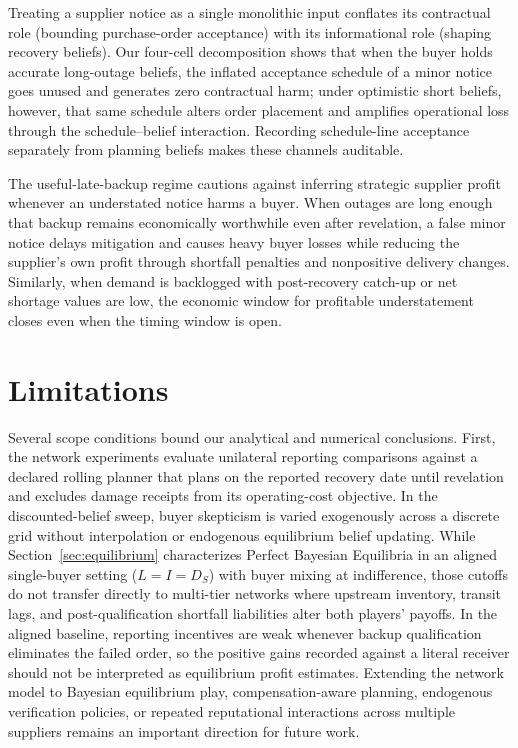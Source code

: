 \documentclass[preprint,11pt,authoryear]{elsarticle}
\begin{document}
Treating a supplier notice as a single monolithic input conflates its contractual role (bounding purchase-order acceptance) with its informational role (shaping recovery beliefs). Our four-cell decomposition shows that when the buyer holds accurate long-outage beliefs, the inflated acceptance schedule of a minor notice goes unused and generates zero contractual harm; under optimistic short beliefs, however, that same schedule alters order placement and amplifies operational loss through the schedule--belief interaction. Recording schedule-line acceptance separately from planning beliefs makes these channels auditable.

The useful-late-backup regime cautions against inferring strategic supplier profit whenever an understated notice harms a buyer. When outages are long enough that backup remains economically worthwhile even after revelation, a false minor notice delays mitigation and causes heavy buyer losses while reducing the supplier's own profit through shortfall penalties and nonpositive delivery changes. Similarly, when demand is backlogged with post-recovery catch-up or net shortage values are low, the economic window for profitable understatement closes even when the timing window is open.

\section{Limitations}\label{sec:limitations}
Several scope conditions bound our analytical and numerical conclusions. First, the network experiments evaluate unilateral reporting comparisons against a declared rolling planner that plans on the reported recovery date until revelation and excludes damage receipts from its operating-cost objective. In the discounted-belief sweep, buyer skepticism is varied exogenously across a discrete grid without interpolation or endogenous equilibrium belief updating. While Section~\ref{sec:equilibrium} characterizes Perfect Bayesian Equilibria in an aligned single-buyer setting ($L=I=D_S$) with buyer mixing at indifference, those cutoffs do not transfer directly to multi-tier networks where upstream inventory, transit lags, and post-qualification shortfall liabilities alter both players' payoffs. In the aligned baseline, reporting incentives are weak whenever backup qualification eliminates the failed order, so the positive gains recorded against a literal receiver should not be interpreted as equilibrium profit estimates. Extending the network model to Bayesian equilibrium play, compensation-aware planning, endogenous verification policies, or repeated reputational interactions across multiple suppliers remains an important direction for future work.
\end{document}
